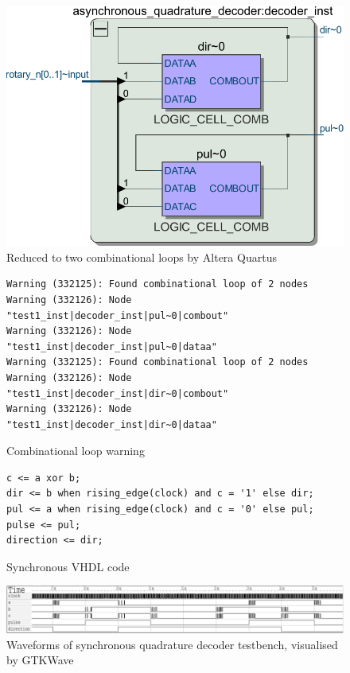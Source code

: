 \documentclass{article}
\begin{document}
\begin{figure}
\centering
\includegraphics[width=\textwidth]{asynchronous_quadrature_decoder_quartus.pdf}
\caption{Reduced to two combinational loops by Altera Quartus}
\end{figure}
\begin{figure}
\centering
\begin{BVerbatim}
Warning (332125): Found combinational loop of 2 nodes
Warning (332126): Node "test1_inst|decoder_inst|pul~0|combout"
Warning (332126): Node "test1_inst|decoder_inst|pul~0|dataa"
Warning (332125): Found combinational loop of 2 nodes
Warning (332126): Node "test1_inst|decoder_inst|dir~0|combout"
Warning (332126): Node "test1_inst|decoder_inst|dir~0|dataa"
\end{BVerbatim}
\caption{Combinational loop warning}
\end{figure}
\begin{figure}
\centering
\begin{BVerbatim}
c <= a xor b;
dir <= b when rising_edge(clock) and c = '1' else dir;
pul <= a when rising_edge(clock) and c = '0' else pul;
pulse <= pul;
direction <= dir;
\end{BVerbatim}
\caption{Synchronous VHDL code}
\end{figure}
\begin{figure}
\centering
\includegraphics[width=\textwidth]{quadrature_decoder_gtkwave.pdf}
\caption{Waveforms of synchronous quadrature decoder testbench, visualised by GTKWave}
\end{figure}
\end{document}
